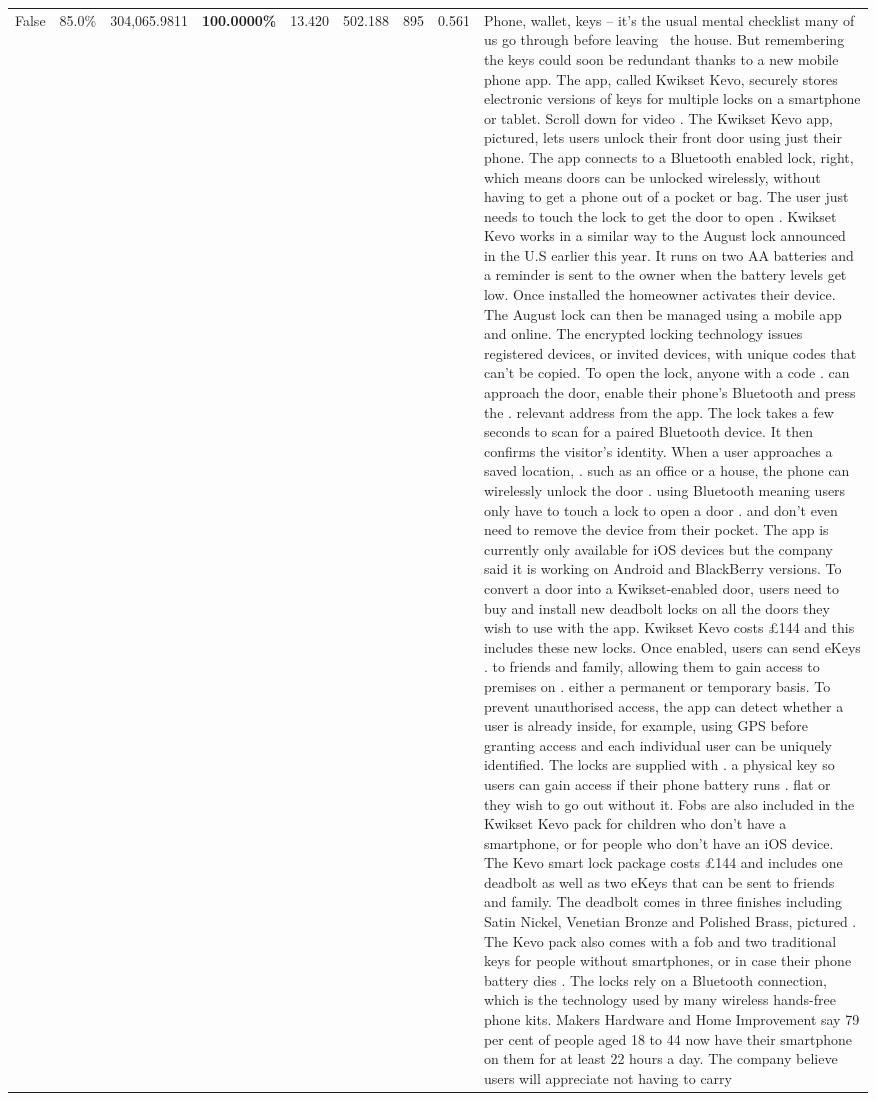 \begin{table}[H]
\begin{tabular}{lllrlllll}
False & 85.0\% & \color{red} 304,065.9811 & \bfseries \color{red} 100.0000\% & 13.420 & 502.188 & 895 & 0.561 & Phone, wallet, keys – it’s the usual mental checklist many of us go through before leaving  the house. But remembering the keys could soon be redundant thanks to a new mobile phone app. The app, called Kwikset Kevo, securely stores electronic versions of keys for multiple locks on a smartphone or tablet. Scroll down for video . The Kwikset Kevo app, pictured, lets users unlock their front door using just their phone. The app connects to a Bluetooth enabled lock, right, which means doors can be unlocked wirelessly, without having to get a phone out of a pocket or bag. The user just needs to touch the lock to get the door to open . Kwikset Kevo works in a similar way to the August lock announced in the U.S earlier this year. It runs on two AA batteries and a reminder is sent to the owner when the battery levels get low. Once installed the homeowner activates their device. The August lock can then be managed using a mobile app and online. The encrypted locking technology issues registered devices, or invited devices, with unique codes that can't be copied. To open the lock, anyone with a code . can approach the door, enable their phone's Bluetooth and press the . relevant address from the app. The lock takes a few seconds to scan for a paired Bluetooth device. It then confirms the visitor's identity. When a user approaches a saved location, . such as an office or a house, the phone can wirelessly unlock the door . using Bluetooth meaning users only have to touch a lock to open a door . and don't even need to remove the device from their pocket. The app is currently only available for iOS devices but the company said it is working on Android and BlackBerry versions. To convert a door into a Kwikset-enabled door, users need to buy and install new deadbolt locks on all the doors they wish to use with the app. Kwikset Kevo costs £144 and this includes these new locks. Once enabled, users can send eKeys . to friends and family, allowing them to gain access to premises on . either a permanent or temporary basis. To prevent unauthorised access, the app can detect whether a user is already inside, for example, using GPS before granting access and each individual user can be uniquely identified. The locks are supplied with . a physical key so users can gain access if their phone battery runs . flat or they wish to go out without it. Fobs are also included in the Kwikset Kevo pack for children who don't have a smartphone, or for people who don't have an iOS device. The Kevo smart lock package costs £144 and includes one deadbolt as well as two eKeys that can be sent to friends and family. The deadbolt comes in three finishes including Satin Nickel, Venetian Bronze and Polished Brass, pictured . The Kevo pack also comes with a fob and two traditional keys for people without smartphones, or in case their phone battery dies . The locks rely on a Bluetooth connection, which is the technology used by many wireless hands-free phone kits. Makers Hardware and Home Improvement say 79 per cent of people aged 18 to 44 now have their smartphone on them for at least 22 hours a day. The company believe users will appreciate not having to carry 
\end{tabular}
\end{table}
